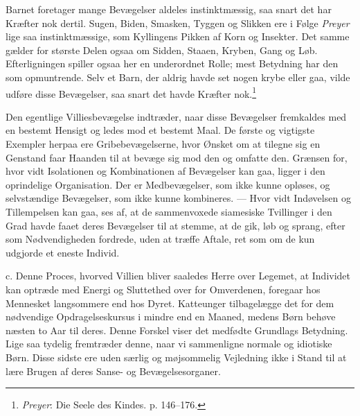 \documentclass[12pt,a4paper,openany]{book}
\newcommand{\opage}[1]{\marginnote{\footnotesize\textit{[#1]}}}
\begin{document}
\opage{378}Barnet foretager mange Bevægelser aldeles instinktmæssig, saa
snart det har Kræfter nok dertil. Sugen, Biden, Smasken, Tyggen og
Slikken ere i Følge \emph{Preyer} lige saa instinktmæssige, som
Kyllingens Pikken af Korn og Insekter. Det samme gælder for største
Delen ogsaa om Sidden, Staaen, Kryben, Gang og Løb. Efterligningen
spiller ogsaa her en underordnet Rolle; mest Betydning har den som
opmuntrende. Selv et Barn, der aldrig havde set nogen krybe eller gaa,
vilde udføre disse Bevægelser, saa snart det havde Kræfter
nok.\footnote[1]{\emph{Preyer}: Die Seele des Kindes. p. 146--176.}

Den egentlige Villiesbevægelse indtræder, naar disse Bevægelser
fremkaldes med en bestemt Hensigt og ledes mod et bestemt Maal. De
første og vigtigste Exempler herpaa ere Gribebevægelserne, hvor Ønsket
om at tilegne sig en Genstand faar Haanden til at bevæge sig mod den og
omfatte den. Grænsen for, hvor vidt Isolationen og Kombinationen af
Bevægelser kan gaa, ligger i den oprindelige Organisation. Der er
Medbevægelser, som ikke kunne opløses, og selvstændige Bevægelser, som
ikke kunne kombineres. --- Hvor vidt Indøvelsen og Tillempelsen kan gaa,
ses af, at de sammenvoxede siamesiske Tvillinger i den Grad havde faaet
deres Bevægelser til at stemme, at de gik, løb og sprang, efter som
Nødvendigheden fordrede, uden at træffe Aftale, ret som om de kun
udgjorde et eneste Individ.

c. Denne Proces, hvorved Villien bliver saaledes Herre over Legemet, at
Individet kan optræde med Energi og Sluttethed over for Omverdenen,
foregaar hos Mennesket langsommere end hos Dyret. Katteunger
tilbagelægge det for dem nødvendige Opdragelseskursus i mindre end en
Maaned, medens Børn behøve næsten to Aar til deres. Denne Forskel viser
det medfødte Grundlags Betydning. Lige saa tydelig fremtræder denne,
naar vi sammenligne normale og idiotiske Børn. Disse sidste ere uden
særlig og møjsommelig Vejledning ikke i Stand til at lære Brugen af
deres Sanse- og Bevægelsesorganer.
\end{document}
